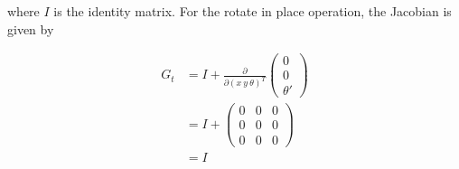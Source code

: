 \documentclass[conference]{IEEEtran}
\begin{document}
where $I$ is the identity matrix. For the rotate in place operation, the Jacobian is given by

\begin{equation}\label{MovementJacobian2}
\begin{aligned}
G_t &= I + \frac{\partial}{\partial(x~y~\theta)^T}
\begin{pmatrix}
	0\\
	0\\
	\theta'
\end{pmatrix}\\
&= I + 
\begin{pmatrix}
	0 &0 &0\\
	0 &0 &0\\
	0 &0 &0
\end{pmatrix}\\
&= I
\end{aligned}
\end{equation}


\end{document}
